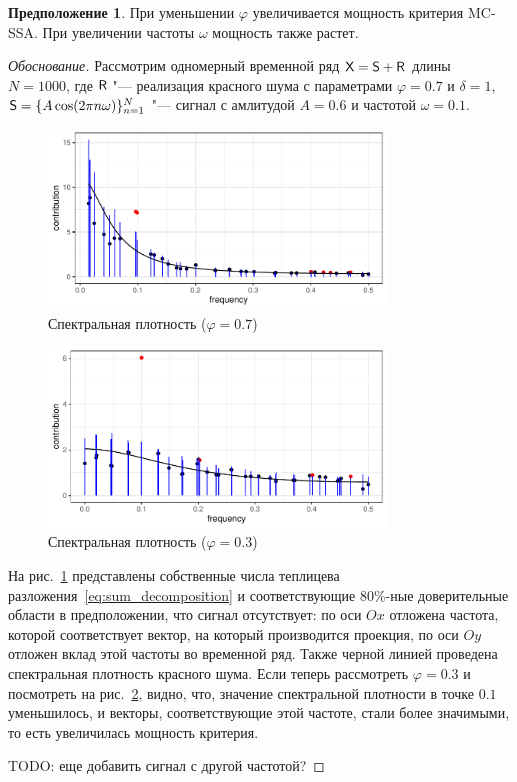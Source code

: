 \documentclass[specialist,
substylefile = spbu_report.rtx,
subf,href,colorlinks=true, 12pt]{disser}
\theoremstyle{definition}
\newtheorem{assumption}{Предположение}
\begin{document}
\begin{assumption}\label{statement1}
	При уменьшении $\varphi$ увеличивается мощность критерия MC-SSA. При увеличении частоты $\omega$ мощность также растет.
\end{assumption}
\begin{proof}[Обоснование]
		Рассмотрим одномерный временной ряд $\mathsf{X}=\mathsf{S} + \mathsf{R}$ длины $N=1000$, где $\mathsf{R}$ "--- реализация красного шума с параметрами $\varphi=0.7$ и $\delta=1$, $\mathsf{S} = \{A\cos(2\pi n \omega)\}_{n=1}^N$ "--- сигнал с амлитудой $A=0.6$ и частотой $\omega=0.1$.
		\begin{figure}[h]
			\centering
			\includegraphics[width=0.8\textwidth]{img/mcssa_spec_phi7.pdf}
			\caption{Спектральная плотность ($\varphi=0.7$)}
			\label{fig:mcssa_spec_phi7}
		\end{figure}
		\begin{figure}[h]
			\centering
			\includegraphics[width=0.8\textwidth]{img/mcssa_spec_phi3.pdf}
			\caption{Спектральная плотность ($\varphi=0.3$)}
			\label{fig:mcssa_spec_phi3}
		\end{figure}

		 На рис.~\ref{fig:mcssa_spec_phi7} представлены собственные числа теплицева разложения~\eqref{eq:sum_decomposition} и соответствующие $80\%$-ные доверительные области в предположении, что сигнал отсутствует: по оси $Ox$ отложена частота, которой соответствует вектор, на который производится проекция, по оси $Oy$ отложен вклад этой частоты во временной ряд. Также черной линией проведена спектральная плотность красного шума. Если теперь рассмотреть $\varphi=0.3$ и посмотреть на рис.~\ref{fig:mcssa_spec_phi3}, видно, что, значение спектральной плотности в точке $0.1$ уменьшилось, и векторы, соответствующие этой частоте, стали более значимыми, то есть увеличилась мощность критерия.

TODO: еще добавить сигнал с другой частотой?
	\end{proof}
\end{document}

